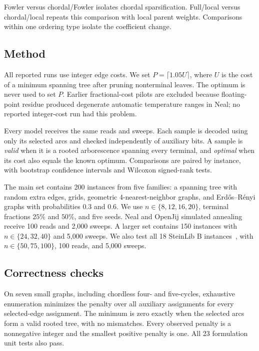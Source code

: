 \documentclass[10pt,a4paper]{article}
\begin{document}
Fowler versus chordal/Fowler isolates chordal sparsification. Full/local versus
chordal/local repeats this comparison with local parent weights. Comparisons
within one ordering type isolate the coefficient change.

\subsection{Method}

All reported runs use integer edge costs. We set
$P=\lceil1.05U\rceil$, where $U$ is the cost of a minimum spanning tree after
pruning nonterminal leaves. The optimum is never used to set $P$. Earlier
fractional-cost pilots are excluded because floating-point residue produced
degenerate automatic temperature ranges in Neal; no reported integer-cost run
had this problem.

Every model receives the same reads and sweeps. Each sample is decoded using
only its selected arcs and checked independently of auxiliary bits. A sample
is \emph{valid} when it is a rooted arborescence spanning every terminal, and
\emph{optimal} when its cost also equals the known optimum. Comparisons are
paired by instance, with bootstrap confidence intervals and Wilcoxon
signed-rank tests.

The main set contains 200 instances from five families: a spanning tree with
random extra edges, grids, geometric 4-nearest-neighbor graphs, and
Erd\H{o}s--R\'enyi graphs with probabilities $0.3$ and $0.6$. We use
$n\in\{8,12,16,20\}$, terminal fractions $25\%$ and $50\%$, and five seeds.
Neal and OpenJij simulated annealing receive 100 reads and 2,000 sweeps. A
larger set contains 150 instances with $n\in\{24,32,40\}$ and 5,000 sweeps.
We also test all 18 SteinLib B instances~\cite{koch2001}, with
$n\in\{50,75,100\}$, 100 reads, and 5,000 sweeps.

\subsection{Correctness checks}

On seven small graphs, including chordless four- and five-cycles, exhaustive
enumeration minimizes the penalty over all auxiliary assignments for every
selected-edge assignment. The minimum is zero exactly when the selected arcs
form a valid rooted tree, with no mismatches. Every observed penalty is a
nonnegative integer and the smallest positive penalty is one. All 23
formulation unit tests also pass.
\end{document}
